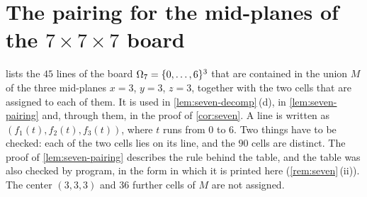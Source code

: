 \section{The pairing for the mid-planes of the \texorpdfstring{$7\times7\times7$}{7x7x7}
board}\label{sec:seven-pairing}

 lists the $45$ lines of the board $\Omega_7=\{0,\dots,6\}^3$ that are contained in
the union $M$ of the three mid-planes $x=3$, $y=3$, $z=3$, together with the two cells that are assigned
to each of them. It is used in \cref{lem:seven-decomp}\,(d), in \cref{lem:seven-pairing} and, through
them, in the proof of \cref{cor:seven}. A line is written as $(f_1(t),f_2(t),f_3(t))$, where $t$ runs
from $0$ to $6$. Two things have to be checked: each of the two cells lies on its line, and the $90$
cells are distinct. The proof of \cref{lem:seven-pairing} describes the rule behind the table, and the
table was also checked by program, in the form in which it is printed here (\cref{rem:seven}\,(ii)). The
center $(3,3,3)$ and $36$ further cells of $M$ are not assigned.

